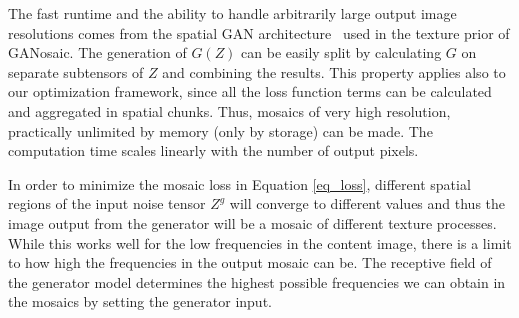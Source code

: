 \documentclass{article}
\begin{document}
The fast runtime and the ability to handle arbitrarily large output image resolutions comes from the spatial GAN architecture~\cite{SGAN2016} used in the texture prior of GANosaic. The generation of $G(Z)$ can be easily split by calculating $G$ on separate subtensors of $Z$ and combining the results. This property applies also to our optimization framework, since all the loss function terms can be calculated and aggregated in spatial chunks. Thus, mosaics of very high resolution, practically unlimited by memory (only by storage) can be made. The computation time scales linearly with the number of output pixels.

In order to minimize the mosaic loss in Equation \ref{eq_loss}, different spatial regions of the input noise tensor $Z^g$ will converge to different values and thus the image output from the generator will be a mosaic of different texture processes. While this works well for the low frequencies in the content image, there is a limit to how high the frequencies in the output mosaic can be. The receptive field of the generator model determines the highest possible frequencies we can obtain in the mosaics by setting the generator input.   %
\end{document}
